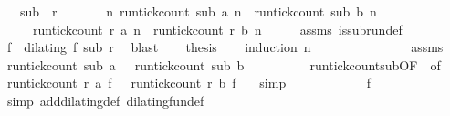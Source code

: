 \begin{isabellebody}
\ \ \ {\isacartoucheopen}sub\ {\isasymlless}\ r{\isacartoucheclose}\isanewline
\ \ \ \ \ \ \ {\isacartoucheopen}{\isasymforall}n{\isachardot}\ run{\isacharunderscore}tick{\isacharunderscore}count\ sub\ a\ n\ {\isasymle}\ run{\isacharunderscore}tick{\isacharunderscore}count\ sub\ b\ n{\isacartoucheclose}\isanewline
\ \ \ \ \ {\isacartoucheopen}run{\isacharunderscore}tick{\isacharunderscore}count\ r\ a\ n\ {\isasymle}\ run{\isacharunderscore}tick{\isacharunderscore}count\ r\ b\ n{\isacartoucheclose}\isanewline
%
\isadelimproof
%
\endisadelimproof
%
\isatagproof
{}\isamarkupfalse%
\ {\isacharminus}\isanewline
\ \ \isamarkupfalse%
\ assms{\isacharparenleft}{}{\isacharparenright}\ is{\isacharunderscore}subrun{\isacharunderscore}def\ \isamarkupfalse%
\ f\ \ {\isacharasterisk}{\isacharcolon}{\isacartoucheopen}dilating\ f\ sub\ r{\isacartoucheclose}\ \isamarkupfalse%
\ blast\isanewline
\ \ \isamarkupfalse%
\ {\isacharquery}thesis\isanewline
\ \ \isamarkupfalse%
\ {\isacharparenleft}induction\ n{\isacharparenright}\isanewline
\ \ \ \ \isamarkupfalse%
\ {}\ \isanewline
\ \ \ \ \ \ \isamarkupfalse%
\ assms{\isacharparenleft}{}{\isacharparenright}\ \isamarkupfalse%
\ {\isacartoucheopen}run{\isacharunderscore}tick{\isacharunderscore}count\ sub\ a\ {}\ {\isasymle}\ run{\isacharunderscore}tick{\isacharunderscore}count\ sub\ b\ {}{\isacartoucheclose}\ \isacommand{{\isachardot}{\isachardot}}\isamarkupfalse%
\isanewline
\ \ \ \ \ \ \isamarkupfalse%
\ run{\isacharunderscore}tick{\isacharunderscore}count{\isacharunderscore}sub{\isacharbrackleft}OF\ {\isacharasterisk}{\isacharcomma}\ of\ {\isacharunderscore}\ {}{\isacharbrackright}\ \isamarkupfalse%
\ {\isacartoucheopen}run{\isacharunderscore}tick{\isacharunderscore}count\ r\ a\ {\isacharparenleft}f\ {}{\isacharparenright}\ {\isasymle}\ run{\isacharunderscore}tick{\isacharunderscore}count\ r\ b\ {\isacharparenleft}f\ {}{\isacharparenright}{\isacartoucheclose}\ \isamarkupfalse%
\ simp\isanewline
\ \ \ \ \ \ \isamarkupfalse%
\ \isamarkupfalse%
\ {\isacharasterisk}\ \isamarkupfalse%
\ {\isacartoucheopen}f\ {}\ {\isacharequal}\ {}{\isacartoucheclose}\ \isamarkupfalse%
\ {\isacharparenleft}simp\ add{\isacharcolon}dilating{\isacharunderscore}def\ dilating{\isacharunderscore}fun{\isacharunderscore}def{\isacharparenright}\isanewline

\end{isabellebody}
